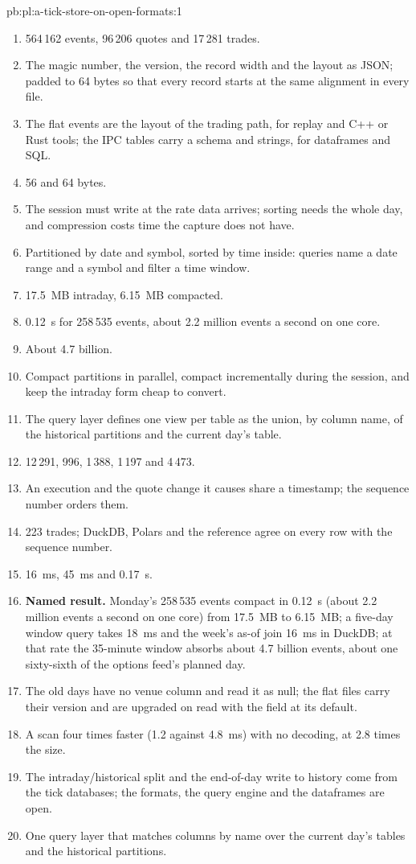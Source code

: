 \begin{solution}{pb:pl:a-tick-store-on-open-formats:1}
\begin{enumerate}
\item 564\,162 events, 96\,206 quotes and 17\,281 trades.
\item The magic number, the version, the record width and the layout as JSON; padded to 64 bytes so that every record starts at
the same alignment in every file.
\item The flat events are the layout of the trading path, for replay and C++ or Rust tools; the IPC tables carry a schema and
strings, for dataframes and SQL.
\item 56 and 64 bytes.
\item The session must write at the rate data arrives; sorting needs the whole day, and compression costs time the capture does not
have.
\item Partitioned by date and symbol, sorted by time inside: queries name a date range and a symbol and filter a time window.
\item 17.5~MB intraday, 6.15~MB compacted.
\item 0.12~s for 258\,535 events, about 2.2 million events a second on one core.
\item About 4.7 billion.
\item Compact partitions in parallel, compact incrementally during the session, and keep the intraday form cheap to convert.
\item The query layer defines one view per table as the union, by column name, of the historical partitions and the current day's
table.
\item 12\,291, 996, 1\,388, 1\,197 and 4\,473.
\item An execution and the quote change it causes share a timestamp; the sequence number orders them.
\item 223 trades; DuckDB, Polars and the reference agree on every row with the sequence number.
\item 16~ms, 45~ms and 0.17~s.
\item \textbf{Named result.} Monday's 258\,535 events compact in 0.12~s (about 2.2 million events a second on one core) from
17.5~MB to 6.15~MB; a five-day window query takes 18~ms and the week's as-of join 16~ms in DuckDB; at that rate the 35-minute
window absorbs about 4.7 billion events, about one sixty-sixth of the options feed's planned day.
\item The old days have no venue column and read it as null; the flat files carry their version and are upgraded on read with the
field at its default.
\item A scan four times faster (1.2 against 4.8~ms) with no decoding, at 2.8 times the size.
\item The intraday/historical split and the end-of-day write to history come from the tick databases; the formats, the query engine
and the dataframes are open.
\item One query layer that matches columns by name over the current day's tables and the historical partitions.
\end{enumerate}
\end{solution}

